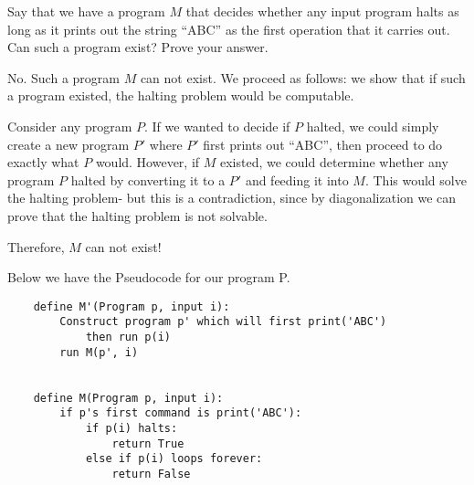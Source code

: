 \question Say that we have a program $M$ that decides whether any input 
program halts as long as it prints out the string “ABC” as the first 
operation that it carries out. Can such a program exist? Prove your answer.

 
 

 
 
\begin{solution} [1 in]
No. Such a program $M$ can not exist. We proceed as follows: we show 
that if such a program existed, the halting problem would be computable.

Consider any program $P$. If we wanted to decide if $P$ halted, we 
could simply create a new program $P'$ where $P'$ first prints out “ABC”, 
then proceed to do exactly what $P$ would. However, if $M$ existed, we 
could determine whether any program $P$ halted by converting it to a $P'$ 
and feeding it into $M$. This would solve the halting problem- but this 
is a contradiction, since by diagonalization we can prove that the 
halting problem is not solvable.

Therefore, $M$ can not exist!  

Below we have the Pseudocode for our program P.

\begin{verbatim}
    define M'(Program p, input i):
        Construct program p' which will first print('ABC') 
            then run p(i)
        run M(p', i)
    
    
    define M(Program p, input i):
        if p's first command is print('ABC'):
            if p(i) halts:
                return True
            else if p(i) loops forever:
                return False
\end{verbatim}

\end{solution}